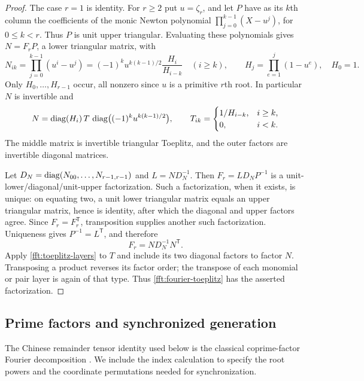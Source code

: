 \begin{proof}
The case $r=1$ is identity.  For $r\ge2$ put $u=\zeta_r$, and let
$P$ have as its $k$th column the coefficients of the monic Newton
polynomial $\prod_{j=0}^{k-1}(X-u^j)$, for $0\le k<r$.
Thus $P$ is unit upper triangular.  Evaluating these polynomials gives
$N=F_rP$, a lower triangular matrix, with
\begin{equation}\label{fft:newton}
 N_{ik}=\prod_{j=0}^{k-1}(u^i-u^j)
   =(-1)^k u^{k(k-1)/2}\frac{H_i}{H_{i-k}}\quad(i\ge k),
 \qquad
 H_j=\prod_{e=1}^j(1-u^e),\quad H_0=1.
\end{equation}
Only $H_0,\ldots,H_{r-1}$ occur, all nonzero since $u$ is a primitive
$r$th root.  In particular $N$ is invertible and
\[
 N=\operatorname{diag}(H_i)\,T\,
       \operatorname{diag}\bigl((-1)^ku^{k(k-1)/2}\bigr),
 \qquad T_{ik}=\begin{cases}1/H_{i-k},&i\ge k,\\0,&i<k.\end{cases}
\]
The middle matrix is invertible triangular Toeplitz, and the outer
factors are invertible diagonal matrices.

Let $D_N=\operatorname{diag}(N_{00},\ldots,N_{r-1,r-1})$ and
$L=ND_N^{-1}$.  Then
$F_r=L D_N P^{-1}$ is a unit-lower/diagonal/unit-upper
factorization.  Such a factorization, when it exists, is unique: on
equating two, a unit lower triangular matrix equals an upper
triangular matrix, hence is identity, after which the diagonal and
upper factors agree.  Since $F_r=F_r^{\mathsf T}$, transposition
supplies another such factorization.  Uniqueness gives
$P^{-1}=L^{\mathsf T}$, and therefore
\begin{equation}\label{fft:fourier-toeplitz}
 F_r=N D_N^{-1}N^{\mathsf T}.
\end{equation}
Apply \cref{fft:toeplitz-layers} to $T$ and include its two diagonal
factors to factor $N$.  Transposing a product reverses its factor
order; the transpose of each monomial or pair layer is again of that
type.  Thus \cref{fft:fourier-toeplitz} has the asserted factorization.
\end{proof}

\subsection{Prime factors and synchronized generation}

The Chinese remainder tensor identity used below is the classical
coprime-factor Fourier decomposition
\citep[Section~12]{good1958}
\citep[Equations~(6)--(10)]{cooleyLewisWelch1967}.
We include the index calculation to specify the root powers and the
coordinate permutations needed for synchronization.

